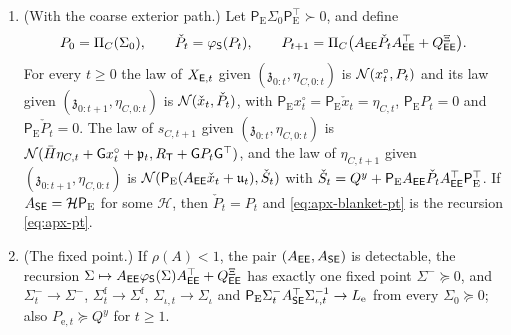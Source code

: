 \begin{lemma}
\begin{enumerate}
\item[(c)] (With the coarse exterior path.) Let $\mathsf P_{\mathrm E}\Sigma_0\mathsf P_{\mathrm E}^\top\succ0$, and define
\begin{equation}\label{eq:apx-blanket-pt}
P_0=\Pi_C(\Sigma_0),\qquad\check P_t=\varphi_{\mathsf{S}}(P_t),\qquad P_{t+1}=\Pi_C\bigl(A_{\mathsf{E}\mathsf{E}}\check P_tA_{\mathsf{E}\mathsf{E}}^\top+Q^{\Xi}_{\mathsf{E}\mathsf{E}}\bigr).
\end{equation}
For every $t\ge0$ the law of $X_{\mathsf{E},t}$ given $(\mathfrak z_{0:t},\eta_{C,0:t})$ is $\mathcal{N}(x^\circ_t,P_t)$ and its law given $(\mathfrak z_{0:t+1},\eta_{C,0:t})$ is $\mathcal{N}(\check x_t,\check P_t)$, with $\mathsf P_{\mathrm E}x^\circ_t=\mathsf P_{\mathrm E}\check x_t=\eta_{C,t}$, $\mathsf P_{\mathrm E}P_t=0$ and $\mathsf P_{\mathrm E}\check P_t=0$. The law of $s_{C,t+1}$ given $(\mathfrak z_{0:t},\eta_{C,0:t})$ is $\mathcal{N}(\bar H\eta_{C,t}+\mathsf Gx^\circ_t+\mathfrak p_t,R_{\mathsf T}+\mathsf GP_t\mathsf G^\top)$, and the law of $\eta_{C,t+1}$ given $(\mathfrak z_{0:t+1},\eta_{C,0:t})$ is $\mathcal{N}(\mathsf P_{\mathrm E}(A_{\mathsf{E}\mathsf{E}}\check x_t+\mathfrak u_t),\check S_t)$ with $\check S_t=Q^y+\mathsf P_{\mathrm E}A_{\mathsf{E}\mathsf{E}}\check P_tA_{\mathsf{E}\mathsf{E}}^\top\mathsf P_{\mathrm E}^\top$. If $A_{\mathsf{S}\mathsf{E}}=\mathcal H\mathsf P_{\mathrm E}$ for some $\mathcal H$, then $\check P_t=P_t$ and \eqref{eq:apx-blanket-pt} is the recursion \eqref{eq:apx-pt}.
\item[(d)] (The fixed point.) If $\rho(A)<1$, the pair $(A_{\mathsf{E}\mathsf{E}},A_{\mathsf{S}\mathsf{E}})$ is detectable, the recursion $\Sigma\mapsto A_{\mathsf{E}\mathsf{E}}\varphi_{\mathsf{S}}(\Sigma)A_{\mathsf{E}\mathsf{E}}^\top+Q^{\Xi}_{\mathsf{E}\mathsf{E}}$ has exactly one fixed point $\Sigma^-\succeq0$, and $\Sigma^-_t\to\Sigma^-$, $\Sigma^{\mathrm f}_t\to\Sigma^{\mathrm f}$, $\Sigma_{\iota,t}\to\Sigma_\iota$ and $\mathsf P_{\mathrm E}\Sigma^-_tA_{\mathsf{S}\mathsf{E}}^\top\Sigma_{\iota,t}^{-1}\to L_{\mathrm e}$ from every $\Sigma_0\succeq0$; also $P_{\mathrm e,t}\succeq Q^y$ for $t\ge1$.
\end{enumerate}
\end{lemma}

